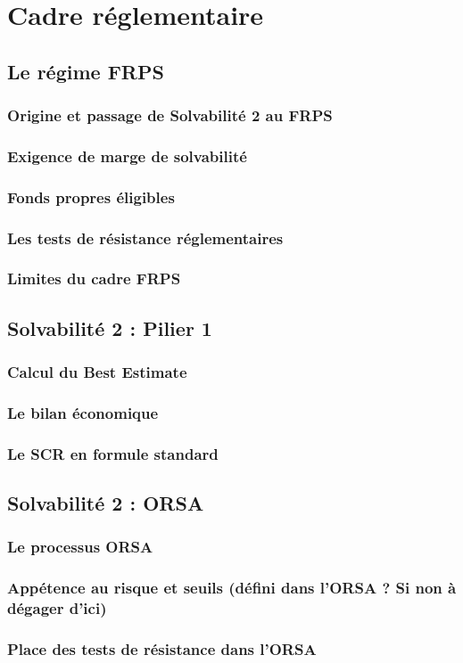 \chapter{Cadre réglementaire}
\label{chap:chap_2}
\section{Le régime FRPS }
\subsection{Origine et passage de Solvabilité 2 au FRPS}
\subsection{Exigence de marge de solvabilité}
\subsection{Fonds propres éligibles}
\subsection{Les tests de résistance réglementaires}
\subsection{Limites du cadre FRPS}

\section{Solvabilité 2 : Pilier 1}
\subsection{ Calcul du Best Estimate}
\subsection{Le bilan économique}
\subsection{Le SCR en formule standard}

\section{Solvabilité 2 : ORSA}
\subsection{Le processus ORSA}
\subsection{Appétence au risque et seuils (défini dans l'ORSA ? Si non à dégager d'ici)}
\subsection{Place des tests de résistance dans l'ORSA}



